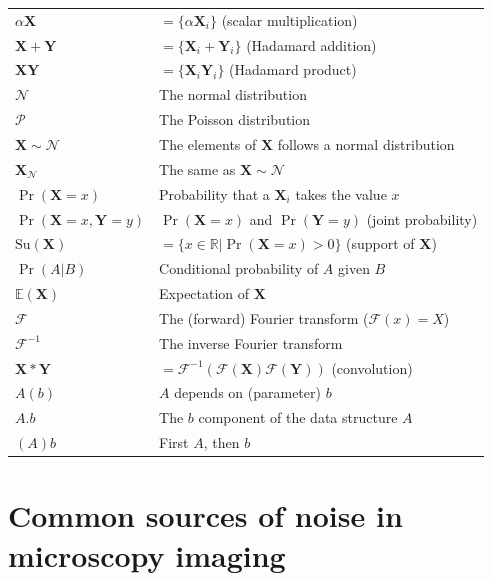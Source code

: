 \documentclass{article}
\begin{document}
\begin{tabular}{ll}
  $\alpha\mathbf{X}$ & $=\{\alpha\mathbf{X}_i\}$ (scalar multiplication) \\
  $\mathbf{X}+\mathbf{Y}$ & $=\{\mathbf{X}_i + \mathbf{Y}_i\}$ (Hadamard addition) \\ 
  $\mathbf{X}\mathbf{Y}$ & $=\{\mathbf{X}_i\mathbf{Y}_i\}$ (Hadamard product) \\ 
  $\mathcal{N}$ & The normal distribution \\ 
  $\mathcal{P}$ & The Poisson distribution \\
  $\mathbf{X}\sim\mathcal{N}$ & The elements of $\mathbf{X}$ follows a normal distribution \\
  $\mathbf{X}_{\mathcal{N}}$ & The same as $\mathbf{X}\sim\mathcal{N}$ \\
  $\Pr(\mathbf{X}=x)$ & Probability that a $\mathbf{X}_i$ takes the value $x$ \\
  $\Pr(\mathbf{X}=x, \mathbf{Y}=y)$ & $\Pr(\mathbf{X}=x)$ and $\Pr(\mathbf{Y}=y)$ (joint probability)  \\
  $\mathrm{Su}(\mathbf{X})$ & $=\{x\in\mathbb{R}|\Pr(\mathbf{X}=x)>0\}$ (support of $\mathbf{X}$)\\
  $\Pr(A|B)$ & Conditional probability of $A$ given $B$ \\
  $\mathbb{E}(\mathbf{X})$ & Expectation of $\mathbf{X}$ \\ 
  $\mathcal{F}$ & The (forward) Fourier transform ($\mathcal{F}(x)=X$) \\
  $\mathcal{F}^{-1}$ & The inverse Fourier transform \\
  $\mathbf{X}*\mathbf{Y}$ & $=\mathcal{F}^{-1}(\mathcal{F}(\mathbf{X})\mathcal{F}(\mathbf{Y}))$ (convolution) \\
  $A(b)$ & $A$ depends on (parameter) $b$ \\
  $A.b$ & The $b$ component of the data structure $A$ \\
  $(A)b$ & First $A$, then $b$ 
\end{tabular}


\section{Common sources of noise in microscopy imaging}
\end{document}

